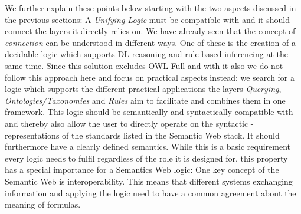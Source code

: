 We further explain these points below starting with the two aspects discussed in the previous sections:
A \emph{Unifying Logic} must be compatible with \rdf and it should 
 connect the layers it directly relies on. We have already seen that the concept of \emph{connection} can be understood in different ways. One of these is the creation of a 
 decidable logic which supports DL reasoning and rule-based inferencing at the same time. Since this solution excludes OWL Full and with it also \rdf we do not follow this approach here 
 and focus on practical aspects instead: we search for a logic which supports the different practical applications the layers \emph{Querying}, \emph{Ontologies/Taxonomies} and 
 \emph{Rules} aim to facilitate and combines them in one framework. This logic should be semantically and syntactically compatible with \rdf and
 thereby also allow the user to directly operate 
 on the syntactic \rdf-representations 
 of the standards listed in the Semantic Web stack. It should furthermore have a clearly defined semantics. While this is a basic requirement every logic needs to fulfil 
 regardless of the role it is designed for, this property has a special importance for a Semantics Web logic: One key concept of 
the Semantic Web is interoperability. This means that different systems exchanging information and applying the logic need to have a common agreement about 
the meaning of formulas.
 
